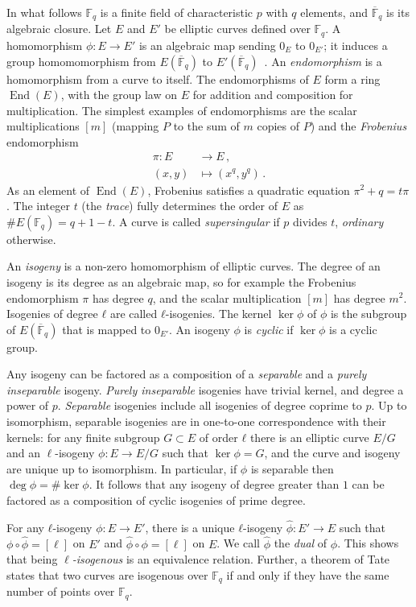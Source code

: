 \documentclass{article}
\newcommand{\F}{\mathbb{F}}
\newcommand{\Fbar}{\overline{\mathbb{F}}}
\theoremstyle{definition}
\DeclareMathOperator{\End}{End}
\begin{document}
In what follows $\F_q$ is a finite field of characteristic $p$ with
$q$ elements, and $\Fbar_q$ is its algebraic closure. Let $E$ and $E'$
be elliptic curves defined over $\F_q$. 
A homomorphism $ϕ:E→E'$ is an
algebraic map sending $0_E$ to $0_{E'}$;
it induces a group homomomorphism from
$E(\Fbar_q)$ to $E'(\Fbar_q)$~\cite[III.4]{silverman:elliptic}.
An \emph{endomorphism} is a homomorphism from a curve to itself.
The endomorphisms of $E$ form a ring $\End(E)$,
with the group law on $E$ for addition
and composition for multiplication.
The simplest examples of endomorphisms
are the scalar multiplications $[m]$
(mapping $P$ to the sum of $m$ copies of $P$)
and the \emph{Frobenius} endomorphism
\begin{align*}
  π : E &\longrightarrow E \,, \\
  (x,y) &\longmapsto (x^q,y^q) \,.
\end{align*}
As an element of $\End(E)$, Frobenius satisfies a quadratic equation
$π^2 + q = tπ$.  The integer $t$ (the \emph{trace})
fully determines the order of $E$ as $\#E(\F_q)=q+1-t$. A curve is
called \emph{supersingular} if $p$ divides $t$, \emph{ordinary}
otherwise.

An \emph{isogeny} is a non-zero homomorphism of elliptic curves.
The
degree of an isogeny is its degree as an algebraic map,
so for example the Frobenius endomorphism $\pi$ has degree $q$,
and the scalar multiplication $[m]$ has degree $m^2$.
Isogenies of degree $ℓ$ are called $ℓ$-isogenies.
The kernel $\ker ϕ$ of $\phi$
is the subgroup of $E(\Fbar_q)$ that is
mapped to $0_{E'}$. 
An isogeny $ϕ$ is \emph{cyclic} 
if $\ker ϕ$ is a cyclic group.

Any isogeny can be factored as a composition of a \emph{separable} and
a \emph{purely inseparable} isogeny. \emph{Purely inseparable}
isogenies have trivial kernel, and degree a power of $p$.
\emph{Separable} isogenies include all
isogenies of degree coprime to $p$.
Up to isomorphism, separable isogenies
are in one-to-one correspondence with their kernels:
for any finite subgroup $G⊂E$ of order $ℓ$ there is 
an elliptic curve $E/G$ and an $\ell$-isogeny $\phi: E \to E/G$
such that $\ker \phi = G$,
and the curve and isogeny are unique up to isomorphism.
In particular, if $\phi$ is separable then $\deg ϕ=\#\ker ϕ$.
It follows
that any isogeny of degree greater than $1$ can be factored as a
composition of cyclic isogenies of prime degree.

For any $ℓ$-isogeny $ϕ:E→E'$, there is a unique $ℓ$-isogeny
$\hat{ϕ}:E'→E$ such that $ϕ∘\hat{ϕ} = [\ell]$ on $E'$
and $\hat{ϕ}∘ϕ = [\ell]$ on $E$.
We call $\hat{ϕ}$ the \emph{dual} of $ϕ$. This
shows that being \emph{$\ell$-isogenous} is an equivalence
relation. Further, a theorem of Tate states that two curves are
isogenous over $\F_q$ if and only if they have the same number of
points over $\F_q$.
\end{document}
